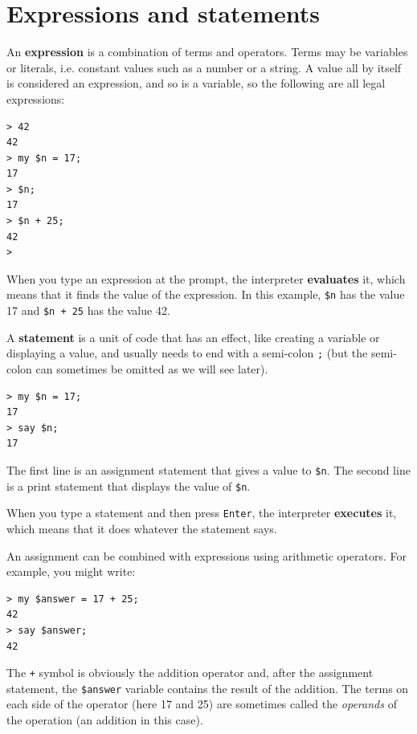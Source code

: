 \section{Expressions and statements}

An {\bf expression} is a combination of terms and operators.
Terms may be variables or literals, i.e. constant values such as a number or a string. A value all by itself is considered an expression, and so is
a variable, so the following are all legal expressions:

\begin{verbatim}
> 42
42
> my $n = 17;
17
> $n;
17
> $n + 25;
42
>
\end{verbatim}
%
When you type an expression at the prompt, the interpreter
{\bf evaluates} it, which means that it finds the value of
the expression.
In this example, {\tt \$n} has the value 17 and
{\tt \$n + 25} has the value 42.

A {\bf statement} is a unit of code that has an effect, like
creating a variable or displaying a value, and usually needs to end 
with a semi-colon {\tt ;} (but the semi-colon can sometimes be omitted 
as we will see later).  

\begin{verbatim}
> my $n = 17;
17
> say $n;
17
\end{verbatim}
%

The first line is an assignment statement that gives a value to
{\tt \$n}.  The second line is a print statement that displays the
value of {\tt \$n}.

When you type a statement and then press {\tt Enter}, the 
interpreter {\bf executes} it, which means that it does 
whatever the statement says.

An assignment can be combined with expressions using arithmetic 
operators. For example, you might write:

\begin{verbatim}
> my $answer = 17 + 25;
42
> say $answer;
42
\end{verbatim}
%

The \verb'+' symbol is obviously the addition operator 
and, after the assignment statement, the \verb'$answer' 
variable contains the result 
of the addition. The terms on each side of the operator 
(here 17 and 25) are sometimes called the \emph{operands} 
of the operation (an addition in this case).

